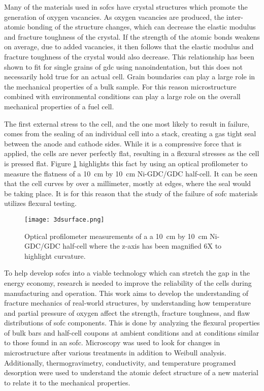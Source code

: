 Many of the materials used in \glspl{sofc} have crystal structures which promote the generation of oxygen vacancies.
As oxygen vacancies are produced, the inter-atomic bonding of the structure changes, which can decrease the elastic modulus and fracture toughness of the crystal.\cite{Bishop2014,Duncan2006}
If the strength of the atomic bonds weakens on average, due to added vacancies, it then follows that the elastic modulus and fracture toughness of the crystal would also decrease.
This relationship has been shown to fit for single grains of \gls{gdc} using nanoindentation, but this does not necessarily hold true for an actual cell.\cite{Wang2007}
Grain boundaries can play a large role in the mechanical properties of a bulk sample.
For this reason microstructure combined with environmental conditions can play a large role on the overall mechanical properties of a fuel cell.

The first external stress to the cell, and the one most likely to result in failure, comes from the  sealing of an individual cell into a stack, creating a gas tight seal between the anode and cathode sides.
While it is a compressive force that is applied, the cells are never perfectly flat, resulting in a flexural stresses as the cell is pressed flat.
Figure \ref{fig:flatness} highlights this fact by using an optical profilometer to measure the flatness of a \SI{10}{\centi\meter} by \SI{10}{\centi\meter} Ni-GDC/GDC half-cell.
It can be seen that the cell curves by over a millimeter, mostly at edges, where the seal would be taking place.
It is for this reason that the study of the failure of \gls{sofc} materials utilizes flexural testing.

\begin{figure}
  \centering
  \texttt{[image: 3dsurface.png]}
  \caption{Optical profilometer measurements of a a \SI{10}{\centi\meter} by \SI{10}{\centi\meter} Ni-GDC/GDC half-cell where the z-axis has been magnified 6X to highlight curvature.}\label{fig:flatness}
\end{figure}



To help develop \glspl{sofc} into a viable technology which can stretch the gap in the energy economy, research is needed to improve the reliability of the cells during manufacturing and operation.
This work aims to develop the understanding of fracture mechanics of real-world structures, by understanding how temperature and partial pressure of oxygen affect the strength, fracture toughness, and flaw distributions of \gls{sofc} components.
This is done by analyzing the flexural properties of bulk bars and half-cell coupons at ambient conditions and at conditions similar to those found in an \gls{sofc}.
Microscopy was used to look for changes in microstructure after various treatments in addition to Weibull analysis.
Additionally, thermogravimetry, conductivity, and temperature programed desorption were used to understand the atomic defect structure of a new material to relate it to the mechanical properties.

